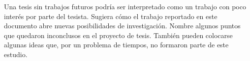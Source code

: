 Una tesis sin trabajos futuros podría ser interpretado como un trabajo con poco interés por parte del tesista. Sugiera cómo el trabajo reportado en este documento abre nuevas posibilidades de investigación. Nombre algunos puntos que quedaron inconclusos en el proyecto de tesis. También pueden colocarse algunas ideas que, por un problema de tiempos, no formaron parte de este estudio. 